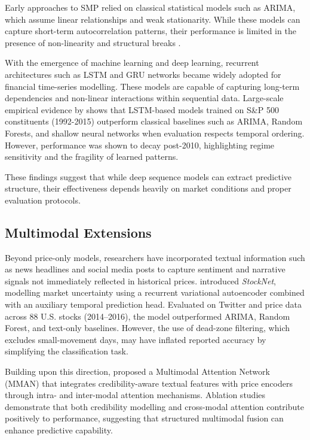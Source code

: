 \documentclass{l4proj}
\begin{document}
Early approaches to SMP relied on classical statistical models such as ARIMA, which assume linear relationships and weak stationarity. While these models can capture short-term autocorrelation patterns, their performance is limited in the presence of non-linearity and structural breaks \citep{Ho_2021}.

With the emergence of machine learning and deep learning, recurrent architectures such as LSTM and GRU networks became widely adopted for financial time-series modelling. These models are capable of capturing long-term dependencies and non-linear interactions within sequential data. Large-scale empirical evidence by \citet{FISCHER2018654} shows that LSTM-based models trained on S\&P 500 constituents (1992-2015) outperform classical baselines such as ARIMA, Random Forests, and shallow neural networks when evaluation respects temporal ordering. However, performance was shown to decay post-2010, highlighting regime sensitivity and the fragility of learned patterns.

These findings suggest that while deep sequence models can extract predictive structure, their effectiveness depends heavily on market conditions and proper evaluation protocols.

\subsection{Multimodal Extensions}

Beyond price-only models, researchers have incorporated textual information such as news headlines and social media posts to capture sentiment and narrative signals not immediately reflected in historical prices. \citet{xu-cohen-2018-stock} introduced \textit{StockNet}, modelling market uncertainty using a recurrent variational autoencoder combined with an auxiliary temporal prediction head. Evaluated on Twitter and price data across 88 U.S. stocks (2014–2016), the model outperformed ARIMA, Random Forest, and text-only baselines. However, the use of dead-zone filtering, which excludes small-movement days, may have inflated reported accuracy by simplifying the classification task.

Building upon this direction, \citet{he2022multimodalattentionnetworkstock} proposed a Multimodal Attention Network (MMAN) that integrates credibility-aware textual features with price encoders through intra- and inter-modal attention mechanisms. Ablation studies demonstrate that both credibility modelling and cross-modal attention contribute positively to performance, suggesting that structured multimodal fusion can enhance predictive capability. 
\end{document}
